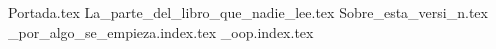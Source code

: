 {Portada.tex}
\tableofcontents
{La_parte_del_libro_que_nadie_lee.tex}
{Sobre_esta_versi_n.tex}
{_por_algo_se_empieza.index.tex}
{_oop.index.tex}